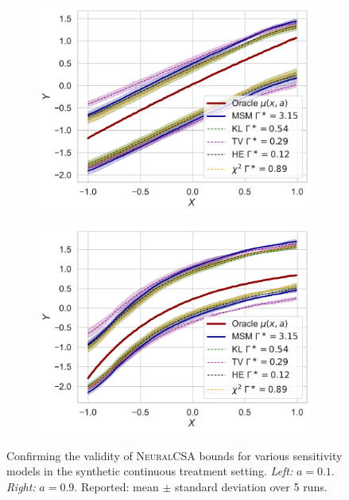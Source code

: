 \documentclass{article} %
\newcommand{\frameworkname}{\textsc{NeuralCSA}\xspace}
\theoremstyle{definition}
\theoremstyle{plain}
\begin{document}
\begin{figure}[ht]
 \centering
\begin{subfigure}{0.45\textwidth}
  \centering
  \includegraphics[width=1\linewidth]{figures/plot_continuous_1D_f_a01.pdf}
\end{subfigure}%
\begin{subfigure}{0.45\textwidth}
  \centering
  \includegraphics[width=1\linewidth]{figures/plot_continuous_1D_f_a09.pdf}
\end{subfigure}
\caption{Confirming the validity of \frameworkname bounds for various sensitivity models in the synthetic continuous treatment setting. \emph{Left:} $a=0.1$. \emph{Right:} $a=0.9$. Reported: mean $\pm$ standard deviation over 5 runs.}
\label{fig:app_treat_f}
\end{figure}
\end{document}
